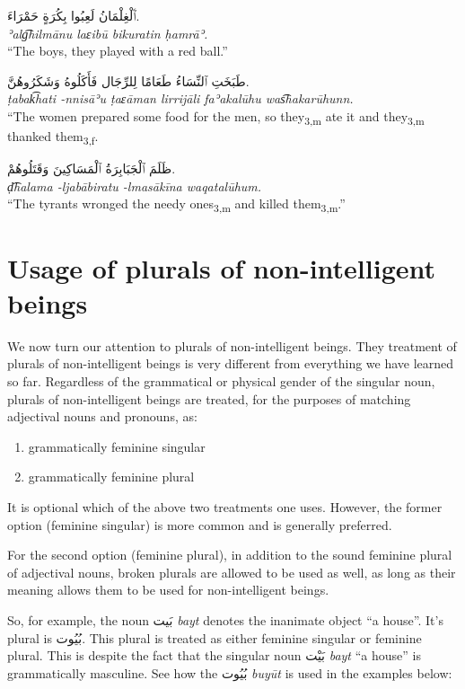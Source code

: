 \documentclass[
  10pt,
]{book}
\providecommand{\tightlist}{%
  \setlength{\itemsep}{0pt}\setlength{\parskip}{0pt}}
\begin{document}
\foreignlanguage{arabic}{ٱَلْغِلْمَانُ لَعِبُوا بِکُرَةٍ حَمْرَاءَ.}\\
\emph{ʾalg͡hilmānu laɛibū bikuratin ḥamrāʾ.}\\
\enquote{The boys, they played with a red ball.}

\foreignlanguage{arabic}{طَبَخَتِ ٱلنِّسَاءُ طَعَامًا لِلرِّجَال فَأَکَلُوهُ وَشَکَرُوهُنَّ.}\\
\emph{ṭabak͡hati -nnisāʾu ṭaɛāman lirrijāli faʾakalūhu was͡hakarūhunn.}\\
``The women prepared some food for the men, so they\textsubscript{3,m} ate it and they\textsubscript{3,m} thanked them\textsubscript{3,f}.

\foreignlanguage{arabic}{ظَلَمَ ٱلْجَبَابِرَةُ ٱلْمَسَاکِينَ وَقَتَلُوهُمْ.}\\
\emph{ḍ͡halama -ljabābiratu -lmasākīna waqatalūhum.}\\
\enquote{The tyrants wronged the needy ones\textsubscript{3,m} and killed them\textsubscript{3,m}.}

\section{Usage of plurals of non-intelligent beings}\label{usage-of-plurals-of-non-intelligent-beings}

We now turn our attention to plurals of non-intelligent beings. They treatment of plurals of non-intelligent beings is very different from everything we have learned so far. Regardless of the grammatical or physical gender of the singular noun, plurals of non-intelligent beings are treated, for the purposes of matching adjectival nouns and pronouns, as:

\begin{enumerate}
\def\labelenumi{\roman{enumi}.}
\tightlist
\item
  grammatically feminine singular
\item
  grammatically feminine plural
\end{enumerate}

It is optional which of the above two treatments one uses. However, the former option (feminine singular) is more common and is generally preferred.

For the second option (feminine plural), in addition to the sound feminine plural of adjectival nouns, broken plurals are allowed to be used as well, as long as their meaning allows them to be used for non-intelligent beings.

So, for example, the noun \foreignlanguage{arabic}{بَيت} \emph{bayt} denotes the inanimate object \enquote{a house}. It's plural is \foreignlanguage{arabic}{بُيُوت}. This plural is treated as either feminine singular or feminine plural. This is despite the fact that the singular noun \foreignlanguage{arabic}{بَيْت} \emph{bayt} \enquote{a house} is grammatically masculine. See how the \foreignlanguage{arabic}{بُيُوت} \emph{buyūt} is used in the examples below:
\end{document}
